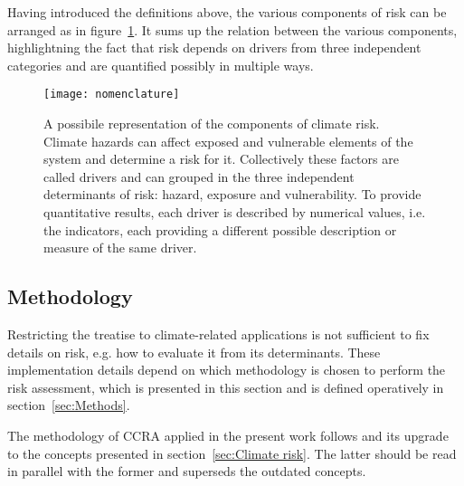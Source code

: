 Having introduced the definitions above, the various components of \gls{risk} can be arranged as in figure~\ref{fig:nomenclature}. It sums up the relation between the various components, highlightning the fact that risk depends on drivers from three independent categories and are quantified possibly in multiple ways.
\begin{figure}[h]
  \centering
  \texttt{[image: nomenclature]}
  \caption{A possibile representation of the components of climate risk. Climate hazards can affect exposed and vulnerable elements of the system and determine a risk for it. Collectively these factors are called drivers and can grouped in the three independent determinants of risk: hazard, exposure and vulnerability. To provide quantitative results, each driver is described by numerical values, i.e. the indicators, each providing a different possible description or measure of the same driver.}
  \label{fig:nomenclature}
\end{figure}



\subsection{Methodology}
\label{sec:Methodology}
Restricting the treatise to climate-related applications is not sufficient to fix details on \gls{risk}, e.g. how to evaluate it from its \glspl{determinant}. These implementation details depend on which methodology is chosen to perform the risk assessment, which is presented in this section and is defined operatively in section~\ref{sec:Methods}.

The methodology of \gls{CCRA} applied in the present work follows \cite{2017GIZTheVulnerability} and its upgrade \cite{2017GIZRiskSupplement} to the concepts presented in section~\ref{sec:Climate risk}. The latter should be read in parallel with the former and superseds the outdated concepts.

